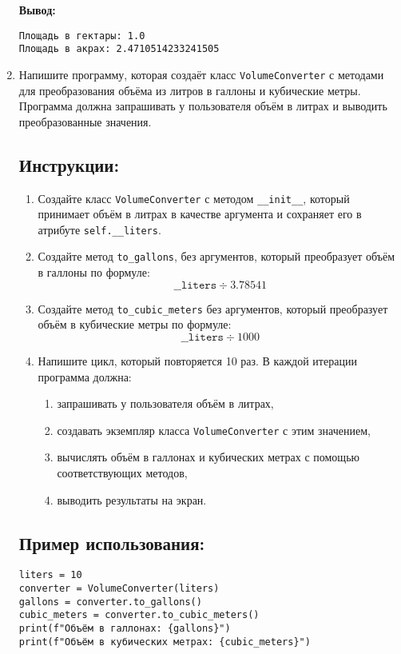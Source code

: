 \begin{enumerate}
\textbf{Вывод:}
\begin{verbatim}
Площадь в гектары: 1.0
Площадь в акрах: 2.4710514233241505
\end{verbatim}

\item 

Напишите программу, которая создаёт класс \texttt{VolumeConverter} с методами для преобразования объёма
из литров в галлоны и кубические метры. Программа должна запрашивать у пользователя объём в литрах
и выводить преобразованные значения.

\subsection*{Инструкции:}
\begin{enumerate}
\item Создайте класс \texttt{VolumeConverter} с методом
\texttt{\_\_init\_\_}, который принимает объём в литрах в
качестве аргумента и сохраняет его в атрибуте \texttt{self.\_\_liters}.

\item Создайте метод \texttt{to\_gallons},
без аргументов, который преобразует объём в галлоны по формуле:
\[
\texttt{\_\_liters} \div 3.78541
\]

\item Создайте метод \texttt{to\_cubic\_meters} без аргументов,
который преобразует объём в кубические метры по формуле:
\[
\texttt{\_\_liters} \div 1000
\]

\item Напишите цикл, который повторяется 10 раз. В каждой итерации программа должна:
\begin{enumerate}
\item запрашивать у пользователя объём в литрах,
\item создавать экземпляр класса \texttt{VolumeConverter} с этим значением,
\item вычислять объём в галлонах и кубических метрах с помощью соответствующих методов,
\item выводить результаты на экран.
\end{enumerate}
\end{enumerate}

\subsection*{Пример использования:}
\begin{verbatim}
liters = 10
converter = VolumeConverter(liters)
gallons = converter.to_gallons()
cubic_meters = converter.to_cubic_meters()
print(f"Объём в галлонах: {gallons}")
print(f"Объём в кубических метрах: {cubic_meters}")
\end{verbatim}


\end{enumerate}
